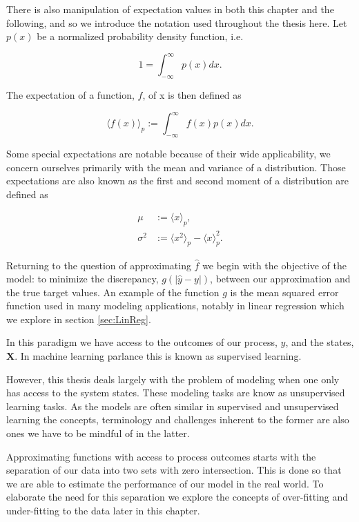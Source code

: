 There is also manipulation of expectation values in both this chapter and the following, and so we introduce the notation used throughout the thesis here. Let $p(x)$ be a normalized probability density function, i.e.

\begin{equation}
1 = \int_{-\infty}^\infty p(x) dx.
\end{equation}

\noindent The expectation of a function, $f$, of x is then defined as 

\begin{equation}\label{eq:expect}
\langle f(x) \rangle_p :=\int_{-\infty}^\infty f(x) p(x) dx.
\end{equation}

\noindent Some special expectations are notable because of their wide applicability, we concern ourselves primarily with the mean and variance of a distribution. Those expectations are also known as the first and second moment of a distribution are defined as

\begin{align}
\mu &:= \langle x \rangle_p, \\
\sigma^2 &:= \langle x^2 \rangle_p  - \langle x\rangle_p^2.
\end{align}

\noindent Returning to the question of approximating $\hat{f}$ we begin with the objective of the model: to minimize the discrepancy, $g(|\hat{y} - y|)$, between our approximation and the true target values. An  example of the function $g$ is the mean squared error function used in many modeling applications, notably in linear regression which we explore in section \ref{sec:LinReg}.

In this paradigm we have access to the outcomes of our process, $\hat{y}$, and the states, $\mathbf{X}$. In machine learning parlance this is known as supervised learning. 

However, this thesis deals largely with the problem of modeling when one only has access to the system states. These modeling tasks are know as unsupervised learning tasks. As the models are often similar in supervised and unsupervised learning the concepts, terminology and challenges inherent to the former are also ones we have to be mindful of in the latter.

Approximating functions with access to process outcomes starts with the separation of our data into two sets with zero intersection. This is done so that we are able to estimate the performance of our model in the real world. To elaborate the need for this separation we explore the concepts of over-fitting and under-fitting to the data later in this chapter.